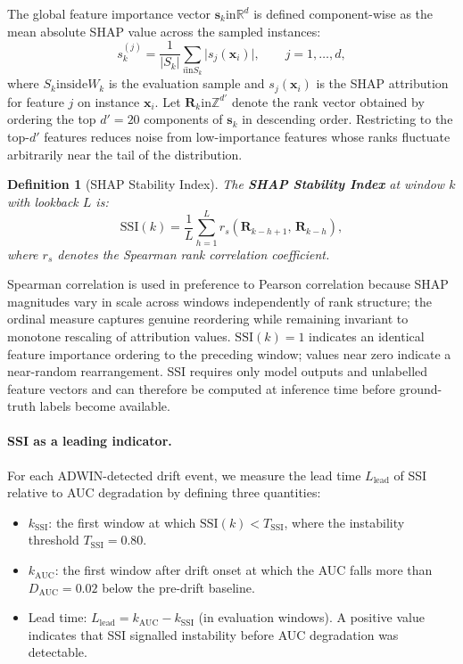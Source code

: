 \documentclass[pdflatex,sn-mathphys-num]{sn-jnl}
\theoremstyle{thmstyleone}
\theoremstyle{thmstyletwo}
\theoremstyle{thmstylethree}
\newtheorem{definition}{Definition}
\begin{document}
The global feature importance vector $\mathbf{s}_k \mathbin{\mathrm{in}} \mathbb{R}^d$
is defined component-wise as the mean absolute SHAP value across the sampled
instances:
\begin{equation}
  s_k^{(j)} = \frac{1}{|S_k|}
    \sum_{i \mathbin{\mathrm{in}} S_k} \bigl|s_j(\mathbf{x}_i)\bigr|,
  \qquad j = 1, \ldots, d,
  \label{eq:global_shap}
\end{equation}
where $S_k \mathbin{\mathrm{inside}} W_k$ is the evaluation sample and $s_j(\mathbf{x}_i)$
is the SHAP attribution for feature $j$ on instance $\mathbf{x}_i$. Let
$\mathbf{R}_k \mathbin{\mathrm{in}} \mathbb{Z}^{d'}$ denote the rank vector obtained by ordering
the top $d' = 20$ components of $\mathbf{s}_k$ in descending order.
Restricting to the top-$d'$ features reduces noise from low-importance features
whose ranks fluctuate arbitrarily near the tail of the distribution.

\begin{definition}[SHAP Stability Index]
\label{def:ssi}
The \textbf{SHAP Stability Index} at window $k$ with lookback $L$ is:
\begin{equation}
  \mathrm{SSI}(k)
    = \frac{1}{L} \sum_{h=1}^{L}
        r_s\!\left(\mathbf{R}_{k-h+1},\, \mathbf{R}_{k-h}\right),
  \label{eq:ssi}
\end{equation}
where $r_s$ denotes the Spearman rank correlation coefficient.
\end{definition}

Spearman correlation is used in preference to Pearson correlation because SHAP
magnitudes vary in scale across windows independently of rank structure; the
ordinal measure captures genuine reordering while remaining invariant to
monotone rescaling of attribution values. $\mathrm{SSI}(k) = 1$ indicates an
identical feature importance ordering to the preceding window; values near zero
indicate a near-random rearrangement. SSI requires only model outputs and
unlabelled feature vectors and can therefore be computed at inference time
before ground-truth labels become available.

\paragraph{SSI as a leading indicator.}
For each ADWIN-detected drift event, we measure the lead time $L_{\mathrm{lead}}$ of SSI
relative to AUC degradation by defining three quantities:
\begin{itemize}
  \item $k_{\mathrm{SSI}}$: the first window at which
        $\mathrm{SSI}(k) < T_{\mathrm{SSI}}$, where the instability
        threshold $T_{\mathrm{SSI}} = 0.80$.
  \item $k_{\mathrm{AUC}}$: the first window after drift onset at which the
        AUC falls more than $D_{\mathrm{AUC}} = 0.02$ below the pre-drift baseline.
  \item Lead time: $L_{\mathrm{lead}} = k_{\mathrm{AUC}} - k_{\mathrm{SSI}}$ (in
        evaluation windows). A positive value indicates that SSI signalled
        instability before AUC degradation was detectable.
\end{itemize}
\end{document}
